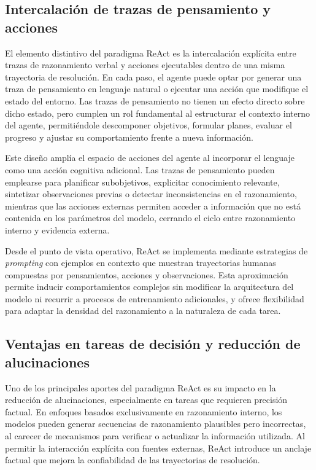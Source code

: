\documentclass[
	spanish, %
	letterpaper, oneside
]{book}
\begin{document}
\subsection{Intercalación de trazas de pensamiento y acciones}

El elemento distintivo del paradigma ReAct es la intercalación explícita entre trazas de razonamiento verbal y acciones ejecutables dentro de una misma trayectoria de resolución. En cada paso, el agente puede optar por generar una traza de pensamiento en lenguaje natural o ejecutar una acción que modifique el estado del entorno. Las trazas de pensamiento no tienen un efecto directo sobre dicho estado, pero cumplen un rol fundamental al estructurar el contexto interno del agente, permitiéndole descomponer objetivos, formular planes, evaluar el progreso y ajustar su comportamiento frente a nueva información.

Este diseño amplía el espacio de acciones del agente al incorporar el lenguaje como una acción cognitiva adicional. Las trazas de pensamiento pueden emplearse para planificar subobjetivos, explicitar conocimiento relevante, sintetizar observaciones previas o detectar inconsistencias en el razonamiento, mientras que las acciones externas permiten acceder a información que no está contenida en los parámetros del modelo, cerrando el ciclo entre razonamiento interno y evidencia externa.

Desde el punto de vista operativo, ReAct se implementa mediante estrategias de \emph{prompting} con ejemplos en contexto que muestran trayectorias humanas compuestas por pensamientos, acciones y observaciones. Esta aproximación permite inducir comportamientos complejos sin modificar la arquitectura del modelo ni recurrir a procesos de entrenamiento adicionales, y ofrece flexibilidad para adaptar la densidad del razonamiento a la naturaleza de cada tarea.

\subsection{Ventajas en tareas de decisión y reducción de alucinaciones}

Uno de los principales aportes del paradigma ReAct es su impacto en la reducción de alucinaciones, especialmente en tareas que requieren precisión factual. En enfoques basados exclusivamente en razonamiento interno, los modelos pueden generar secuencias de razonamiento plausibles pero incorrectas, al carecer de mecanismos para verificar o actualizar la información utilizada. Al permitir la interacción explícita con fuentes externas, ReAct introduce un anclaje factual que mejora la confiabilidad de las trayectorias de resolución.
\end{document}
